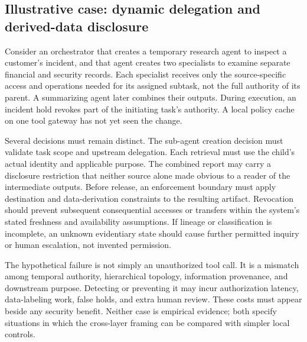 \documentclass[11pt,letterpaper]{article}
\begin{document}
\subsection{Illustrative case: dynamic delegation and derived-data disclosure}
Consider an orchestrator that creates a temporary research agent to inspect a customer's incident, and that agent creates two specialists to examine separate financial and security records. Each specialist receives only the source-specific access and operations needed for its assigned subtask, not the full authority of its parent. A summarizing agent later combines their outputs. During execution, an incident hold revokes part of the initiating task's authority. A local policy cache on one tool gateway has not yet seen the change.

Several decisions must remain distinct. The sub-agent creation decision must validate task scope and upstream delegation. Each retrieval must use the child's actual identity and applicable purpose. The combined report may carry a disclosure restriction that neither source alone made obvious to a reader of the intermediate outputs. Before release, an enforcement boundary must apply destination and data-derivation constraints to the resulting artifact. Revocation should prevent subsequent consequential accesses or transfers within the system's stated freshness and availability assumptions. If lineage or classification is incomplete, an unknown evidentiary state should cause further permitted inquiry or human escalation, not invented permission.

The hypothetical failure is not simply an unauthorized tool call. It is a mismatch among temporal authority, hierarchical topology, information provenance, and downstream purpose. Detecting or preventing it may incur authorization latency, data-labeling work, false holds, and extra human review. These costs must appear beside any security benefit. Neither case is empirical evidence; both specify situations in which the cross-layer framing can be compared with simpler local controls.
\end{document}
